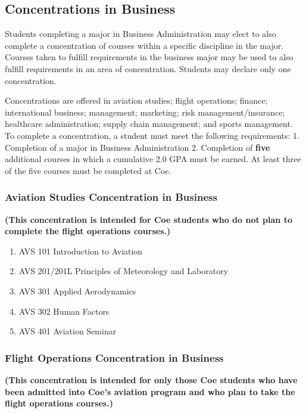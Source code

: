 \documentclass[
  letterpaper,
]{scrbook}
\providecommand{\tightlist}{%
  \setlength{\itemsep}{0pt}\setlength{\parskip}{0pt}}
\begin{document}
\subsection{Concentrations in
Business}\label{concentrations-in-business}

Students completing a major in Business Administration may elect to also
complete a concentration of courses within a specific discipline in the
major. Courses taken to fulfill requirements in the business major may
be used to also fulfill requirements in an area of concentration.
Students may declare only one concentration.

Concentrations are offered in aviation studies; flight operations;
finance; international business; management; marketing; risk
management/insurance; healthcare administration; supply chain
management; and sports management. To complete a concentration, a
student must meet the following requirements: 1. Completion of a major
in Business Administration 2. Completion of \textbf{five} additional
courses in which a cumulative 2.0 GPA must be earned. At least three of
the five courses must be completed at Coe.

\subsubsection{Aviation Studies Concentration in
Business}\label{aviation-studies-concentration-in-business}

\textbf{(This concentration is intended for Coe students who do not plan
to complete the flight operations courses.)}

\begin{enumerate}
\def\labelenumi{\arabic{enumi}.}
\tightlist
\item
  AVS 101 Introduction to Aviation
\item
  AVS 201/201L Principles of Meteorology and Laboratory
\item
  AVS 301 Applied Aerodynamics
\item
  AVS 302 Human Factors
\item
  AVS 401 Aviation Seminar
\end{enumerate}

\subsubsection{Flight Operations Concentration in
Business}\label{flight-operations-concentration-in-business}

\textbf{(This concentration is intended for only those Coe students who
have been admitted into Coe's aviation program and who plan to take the
flight operations courses.)}
\end{document}
